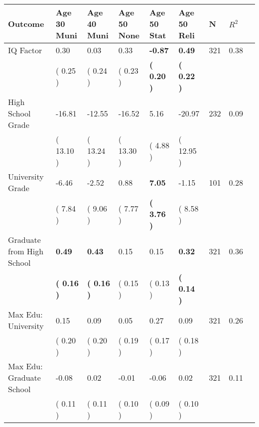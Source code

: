\begin{tabular}{L{6.2cm} C{1.8cm} C{1.8cm} C{1.8cm} C{1.8cm} C{1.8cm} C{1.8cm} C{0.3cm} C{0.3cm}}
\toprule
 \textbf{Outcome} & \textbf{Age 30 Muni} & \textbf{Age 40 Muni} & \textbf{Age 50 None} & \textbf{Age 50 Stat} & \textbf{Age 50 Reli} & \textbf{N} & \textbf{$ R^2$} \\
\midrule
IQ Factor &      0.30 &      0.03 &      0.33 & \textbf{    -0.87} & \textbf{     0.49}  & 321 &       0.38 \\ 
 & (     0.25 ) & (     0.24 ) & (     0.23 ) & \textbf{(     0.20 )} & \textbf{(     0.22 )}  & \\
High School Grade &    -16.81 &    -12.55 &    -16.52 &      5.16 &    -20.97  & 232 &       0.09 \\ 
 & (    13.10 ) & (    13.24 ) & (    13.30 ) & (     4.88 ) & (    12.95 )  & \\
University Grade &     -6.46 &     -2.52 &      0.88 & \textbf{     7.05} &     -1.15  & 101 &       0.28 \\ 
 & (     7.84 ) & (     9.06 ) & (     7.77 ) & \textbf{(     3.76 )} & (     8.58 )  & \\
Graduate from High School & \textbf{     0.49} & \textbf{     0.43} &      0.15 &      0.15 & \textbf{     0.32}  & 321 &       0.36 \\ 
 & \textbf{(     0.16 )} & \textbf{(     0.16 )} & (     0.15 ) & (     0.13 ) & \textbf{(     0.14 )}  & \\
Max Edu: University &      0.15 &      0.09 &      0.05 &      0.27 &      0.09  & 321 &       0.26 \\ 
 & (     0.20 ) & (     0.20 ) & (     0.19 ) & (     0.17 ) & (     0.18 )  & \\
Max Edu: Graduate School &     -0.08 &      0.02 &     -0.01 &     -0.06 &      0.02  & 321 &       0.11 \\ 
 & (     0.11 ) & (     0.11 ) & (     0.10 ) & (     0.09 ) & (     0.10 )  & \\
\bottomrule
\end{tabular}
